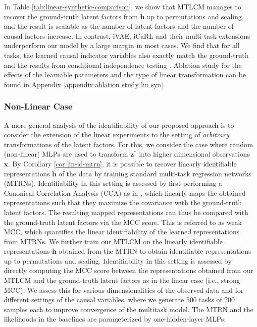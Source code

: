 \documentclass[10pt]{article} %
\theoremstyle{plain}
\theoremstyle{definition}
\begin{document}
In Table \ref{tab:linear-synthetic-comparison}, we show that MTLCM manages to recover the ground-truth latent factors from $\mathbf{h}$ up to permutations and scaling, and the result is scalable as the number of latent factors and the number of causal factors increase. In contrast, iVAE, iCaRL and their multi-task extensions underperform our model by a large margin in most cases.
We find that for all tasks, the learned causal indicator variables also exactly match the ground-truth and the results from conditional independence testing \citep{chen2021causal,Lu_Wu_Hernandez-Lobato_Scholkopf_2022}. Ablation study for the effects of the learnable parameters and the type of linear transformation can be found in Appendix \ref{appendix:ablation study lin syn}.

\subsubsection{Non-Linear Case}
A more general analysis of the identifiability of our proposed approach is to consider the extension of the linear experiments to the setting of \textit{arbitrary} transformations of the latent factors. For this, we consider the case where random (non-linear) MLPs are used to transform $\mathbf{z}^*$ into higher dimensional observations $\mathbf{x}$.
By Corollary \ref{cor:lin-id-mtrn}, it is possible to recover linearly identifiable representations $\mathbf{h}$ of the data by training standard multi-task regression networks (MTRNs). Identifiability in this setting is assessed by first 
performing a Canonical Correlation Analysis (CCA) as in \citet{Roeder_Metz_Kingma_2021}, which linearly maps the obtained representations such that they maximize the covariance with the ground-truth latent factors. The resulting mapped representations can thus be 
compared with the ground-truth latent factors via the MCC score. 
This is referred to as weak MCC, which quantifies the linear identifiability of the learned representations from MTRNs.
We further train our MTLCM on the linearly identifiable representations $\mathbf{h}$ obtained from the MTRN to obtain identifiable representations up to permutations and scaling. Identifiability in this setting is assessed by directly computing the MCC score between the representations obtained from our MTLCM and the ground-truth latent factors as in the linear case (i.e., strong MCC).
We assess this for various dimensionalities of the observed data
and for different settings of the causal variables, where we generate 500 tasks of 200 samples each to improve convergence of the multitask model. 
The MTRN and the likelihoods in the baselines are parameterized by one-hidden-layer MLPs.
\end{document}
